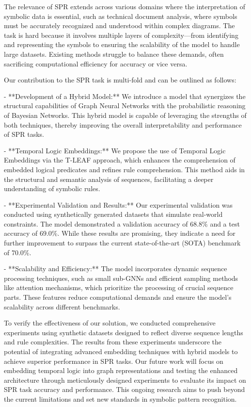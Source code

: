 \documentclass{article}
\begin{document}
The relevance of SPR extends across various domains where the interpretation of symbolic data is essential, such as technical document analysis, where symbols must be accurately recognized and understood within complex diagrams. The task is hard because it involves multiple layers of complexity—from identifying and representing the symbols to ensuring the scalability of the model to handle large datasets. Existing methods struggle to balance these demands, often sacrificing computational efficiency for accuracy or vice versa.

Our contribution to the SPR task is multi-fold and can be outlined as follows:

- **Development of a Hybrid Model:** We introduce a model that synergizes the structural capabilities of Graph Neural Networks with the probabilistic reasoning of Bayesian Networks. This hybrid model is capable of leveraging the strengths of both techniques, thereby improving the overall interpretability and performance of SPR tasks.
  
- **Temporal Logic Embeddings:** We propose the use of Temporal Logic Embeddings via the T-LEAF approach, which enhances the comprehension of embedded logical predicates and refines rule comprehension. This method aids in the structural and semantic analysis of sequences, facilitating a deeper understanding of symbolic rules.

- **Experimental Validation and Results:** Our experimental validation was conducted using synthetically generated datasets that simulate real-world constraints. The model demonstrated a validation accuracy of 68.8\% and a test accuracy of 69.0\%. While these results are promising, they indicate a need for further improvement to surpass the current state-of-the-art (SOTA) benchmark of 70.0\%.

- **Scalability and Efficiency:** The model incorporates dynamic sequence processing techniques, such as small sub-GNNs and efficient sampling methods like attention mechanisms, which prioritize the processing of crucial sequence parts. These features reduce computational demands and ensure the model's scalability across different benchmarks.

To verify the effectiveness of our solution, we conducted comprehensive experiments using synthetic datasets designed to reflect diverse sequence lengths and rule complexities. The results from these experiments underscore the potential of integrating advanced embedding techniques with hybrid models to achieve superior performance in SPR tasks. Our future work will focus on embedding temporal logic into graph representations and testing the enhanced architecture through meticulously designed experiments to evaluate its impact on SPR task accuracy and performance. This ongoing research aims to push beyond the current limitations and set new standards in symbolic pattern recognition.
\end{document}
